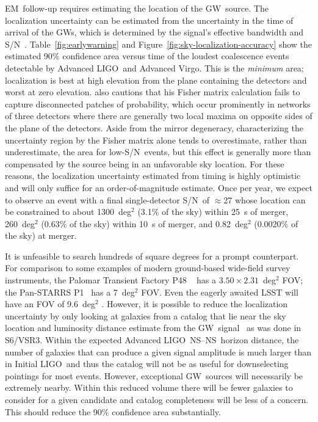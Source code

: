 \documentclass[preprint2]{aastex}
\newcommand{\NS}{NS}
\newcommand{\GW}{GW}%
\newcommand{\EM}{EM}%
\newcommand{\LIGO}{LIGO}%
\newcommand{\SNR}{S/N}%
\begin{document}
\EM\ follow-up requires estimating the location of the \GW\ source. The localization
uncertainty can be estimated from the uncertainty in the time of arrival of the \GW{}s,
which is determined by the signal's effective bandwidth and \SNR\
\citep{Fairhurst2009}.  Table~\ref{fig:earlywarning} and
Figure~\ref{fig:sky-localization-accuracy} show the estimated 90\%
confidence area versus time of the loudest coalescence events detectable by
Advanced \LIGO\ and Advanced Virgo.  This is the \emph{minimum} area; localization is best at high elevation
from the plane containing the detectors and worst at zero elevation.  \citeauthor{Fairhurst2009} also cautions that his Fisher matrix calculation fails to capture disconnected patches of probability, which occur prominently in networks of three detectors where there are generally two local maxima on opposite sides of the plane of the detectors.  Aside from the mirror degeneracy, characterizing the uncertainty region by the Fisher matrix alone tends to overestimate, rather than underestimate, the area for low-\SNR\ events, but this effect is generally more than compensated by the source being in an unfavorable sky location.  For these reasons, the localization uncertainty estimated from timing is highly optimistic and will only suffice for an order-of-magnitude estimate.  Once per year, we expect to observe an
event with a final single-detector \SNR\ of $\approx$27 whose location can be constrained to about
1300~deg$^2$ (3.1\% of the sky) within 25~s of merger,
260~deg$^2$ (0.63\% of the sky) within 10~s of merger, and
0.82~deg$^2$ (0.0020\% of the sky) at merger.

It is unfeasible to search hundreds of square degrees for a prompt counterpart.  For comparison to some examples of modern ground-based wide-field survey instruments, the Palomar Transient Factory P48 ~\citep{2010SPIE.7735E.122L} has a $3.50 \times 2.31$~deg$^2$ FOV; the Pan-STARRS P1~\citep{2002SPIE.4836..154K} has a 7~deg$^2$ FOV.  Even the eagerly awaited LSST will have an FOV of 9.6~deg$^2$ \citep{2008arXiv0805.2366I}.  However, 
it is possible to reduce the localization uncertainty by only looking at
galaxies from a catalog that lie near the sky location and luminosity distance
estimate from the \GW\ signal~\citep{galaxy-catalog} as was done in S6/VSR3.
Within the expected Advanced \LIGO\ \NS--\NS\ horizon distance,
the number of galaxies that can produce a given signal amplitude is much larger
than in Initial \LIGO\ and thus the catalog will not be as useful
for downselecting pointings for most events. However, exceptional \GW\ sources will
necessarily be extremely nearby. Within this reduced volume there will be fewer
galaxies to consider for a given candidate and catalog completeness will be
less of a concern.  This should reduce the 90\% confidence area substantially.
\end{document}
